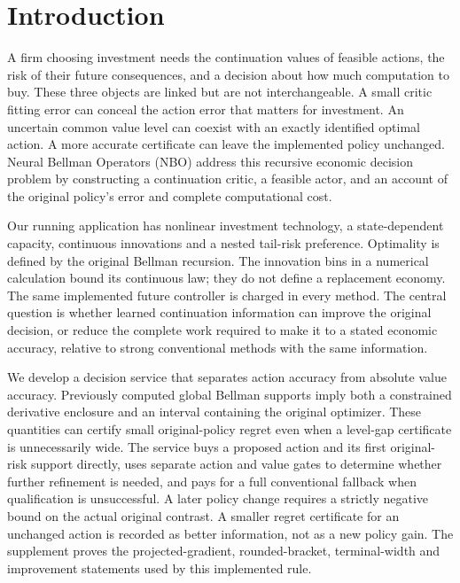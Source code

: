 \section{Introduction}\label{sec:introduction126}

A firm choosing investment needs the continuation values of feasible actions,
the risk of their future consequences, and a decision about how much computation
to buy. These three objects are linked but are not interchangeable. A small
critic fitting error can conceal the action error that matters for investment.
An uncertain common value level can coexist with an exactly identified optimal
action. A more accurate certificate can leave the implemented policy unchanged.
Neural Bellman Operators (NBO) address this recursive economic decision problem
by constructing a continuation critic, a feasible actor, and an account of the
original policy's error and complete computational cost.

Our running application has nonlinear investment technology, a state-dependent
capacity, continuous innovations and a nested tail-risk preference. Optimality
is defined by the original Bellman recursion. The innovation bins in a numerical
calculation bound its continuous law; they do not define a replacement economy.
The same implemented future controller is charged in every method. The central
question is whether learned continuation information can improve the original
decision, or reduce the complete work required to make it to a stated economic
accuracy, relative to strong conventional methods with the same information.

We develop a decision service that separates action accuracy from absolute value
accuracy. Previously computed global Bellman supports imply both a constrained
derivative enclosure and an interval containing the original optimizer. These
quantities can certify small original-policy regret even when a level-gap
certificate is unnecessarily wide. The service buys a proposed action and its
first original-risk support directly, uses separate action and value gates to determine whether further refinement
is needed,
and pays for a full conventional fallback when qualification is unsuccessful.
A later policy change requires a strictly negative bound on the actual original
contrast. A smaller regret certificate for an unchanged action is recorded as
better information, not as a new policy gain. The supplement proves the
projected-gradient, rounded-bracket, terminal-width and improvement statements
used by this implemented rule.

